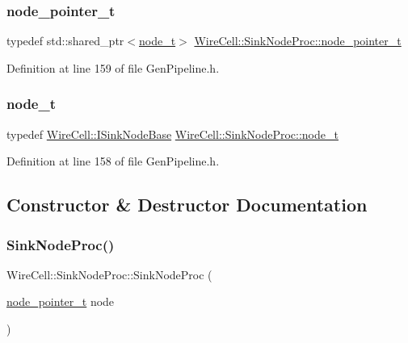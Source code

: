 \subsubsection{\texorpdfstring{node\+\_\+pointer\+\_\+t}{node\_pointer\_t}}
{\footnotesize\ttfamily typedef std\+::shared\+\_\+ptr$<$\hyperlink{class_wire_cell_1_1_sink_node_proc_ae7348fd04b47ae565891a4971b894852}{node\+\_\+t}$>$ \hyperlink{class_wire_cell_1_1_sink_node_proc_a54a5858c419093b066bc8394290e0617}{Wire\+Cell\+::\+Sink\+Node\+Proc\+::node\+\_\+pointer\+\_\+t}}



Definition at line 159 of file Gen\+Pipeline.\+h.

\mbox{\label{class_wire_cell_1_1_sink_node_proc_ae7348fd04b47ae565891a4971b894852}} 
\subsubsection{\texorpdfstring{node\+\_\+t}{node\_t}}
{\footnotesize\ttfamily typedef \hyperlink{class_wire_cell_1_1_i_sink_node_base}{Wire\+Cell\+::\+I\+Sink\+Node\+Base} \hyperlink{class_wire_cell_1_1_sink_node_proc_ae7348fd04b47ae565891a4971b894852}{Wire\+Cell\+::\+Sink\+Node\+Proc\+::node\+\_\+t}}



Definition at line 158 of file Gen\+Pipeline.\+h.



\subsection{Constructor \& Destructor Documentation}
\mbox{\label{class_wire_cell_1_1_sink_node_proc_ac57a7746cf4b4850adf06a071a7d53ab}} 
\subsubsection{\texorpdfstring{Sink\+Node\+Proc()}{SinkNodeProc()}}
{\footnotesize\ttfamily Wire\+Cell\+::\+Sink\+Node\+Proc\+::\+Sink\+Node\+Proc (\begin{DoxyParamCaption}\item[{\hyperlink{class_wire_cell_1_1_sink_node_proc_a54a5858c419093b066bc8394290e0617}{node\+\_\+pointer\+\_\+t}}]{node }\end{DoxyParamCaption})\hspace{0.3cm}{\ttfamily [inline]}}




